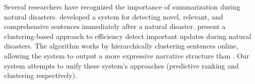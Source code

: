 Several researchers have recognized the importance of summarization during
natural disasters.  \cite{qi:temporal-summarization} developed a system for detecting
novel, relevant, and comprehensive sentences immediately after a natural
disaster.  
\cite{wang:update-summarization} present a clustering-based approach to
efficiency detect important updates during natural disasters.  
The algorithm works by hierarchically
clustering sentences online, allowing the system to output a more expressive
narrative structure than \cite{qi:temporal-summarization}.  
Our system attempts to unify these system's approaches 
(predictive ranking and clustering respectively). 



